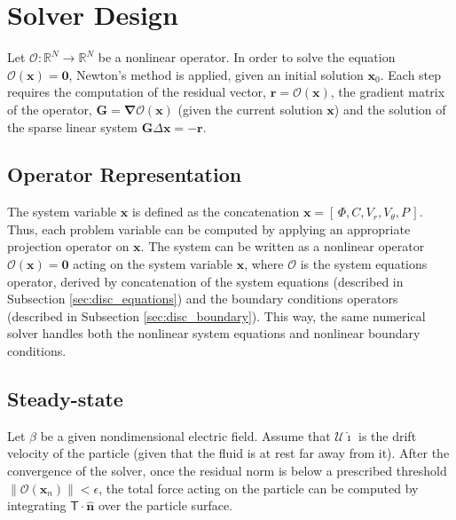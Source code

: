 \documentclass[MSc,beforeExam]{iitcsthesis}
\newcommand{\RR}{\ensuremath{\mathbb{R}}}
\newcommand\bnabla{\boldsymbol{\nabla}}
\newcommand\bn{\boldsymbol{\hat{n}}}
\newcommand\bG{\boldsymbol{G}}
\newcommand\bx{\boldsymbol{x}}
\newcommand\br{\boldsymbol{r}}
\newcommand\bzero{\boldsymbol{0}}
\newcommand\cO{\mathcal{O}}
\newcommand\cU{\mathscr{U}}
\newcommand\tT{\mathsf{T}}
\newcommand\ui{\boldsymbol{\hat{\imath}}}
\begin{document}
\section{Solver Design}
Let $\cO : \RR^N \rightarrow \RR^N $ be a nonlinear operator.
In order to solve the equation $\cO(\bx) = \bzero$, Newton's method is applied, 
given an initial solution $\bx_0$.
Each step requires the computation of the residual vector, $\br = \cO(\bx)$, 
the gradient matrix of the operator, $\bG = \bnabla \cO(\bx)$
(given the current solution $\bx$)
and the solution of the sparse linear system $\bG \Delta \bx = -\br$.

\subsection{Operator Representation}
The system variable $\bx$ is defined as the concatenation $\bx = [\,\varPhi, C, V_r, V_\theta, P\,]$.
Thus, each problem variable can be computed by applying an appropriate projection operator on $\bx$.
The system can be written as a nonlinear operator $\cO(\bx) = \bzero$ 
acting on the system variable ${\bx}$, 
where $\cO$ is the system equations operator, 
derived by concatenation of the system equations (described in Subsection \ref{sec:disc_equations})
and the boundary conditions operators (described in Subsection \ref{sec:disc_boundary}).
This way, the same numerical solver handles both the nonlinear system equations and nonlinear
boundary conditions.

\subsection{Steady-state}
Let $\beta$ be a given nondimensional electric field.
Assume that $\cU \ui$ is the drift velocity of the particle 
(given that the fluid is at rest far away from it).
After the convergence of the solver, once the residual norm is below
a prescribed threshold $\|\cO(\bx_n)\| < \epsilon$, 
the total force acting on the particle  
can be computed by integrating $\tT \cdot \bn$ over the particle surface.
\end{document}
